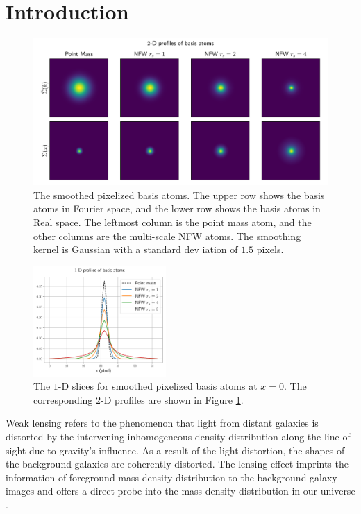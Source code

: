 \documentclass[twocolumn]{aastex62}
\begin{document}
\section{Introduction}

\begin{figure}[!t] \includegraphics[width=1.\textwidth]{nfwlet-atom-2D.pdf}
    \caption{The smoothed pixelized basis atoms. The upper row shows the basis
        atoms in Fourier space, and the lower row shows the basis atoms in Real
        space.  The leftmost column is the point mass atom, and the other
        columns are the multi-scale NFW atoms.  The smoothing kernel is
        Gaussian with a standard dev iation of $1.5$ pixels.
    } \label{fig_atoms2D}
\end{figure}

\begin{figure}
 \includegraphics[width=0.45\textwidth]{nfwlet-atom-1D.pdf}
    \caption{The $1$-D slices for smoothed pixelized basis atoms at $x=0$. The
        corresponding $2$-D profiles are shown in Figure \ref{fig_atoms2D}.
    }
 \label{fig_atoms1D}
\end{figure}

Weak lensing refers to the phenomenon that light from distant galaxies is
distorted by the intervening inhomogeneous density distribution along the line
of sight due to gravity's influence.
As a result of the light distortion, the shapes of the background galaxies are
coherently distorted. The lensing effect imprints the information of
foreground mass density distribution to the background galaxy images and offers
a direct probe into the mass density distribution in our universe
\citep[see][for recent reviews]{revKilbinger15,revRachel17}.
\end{document}
